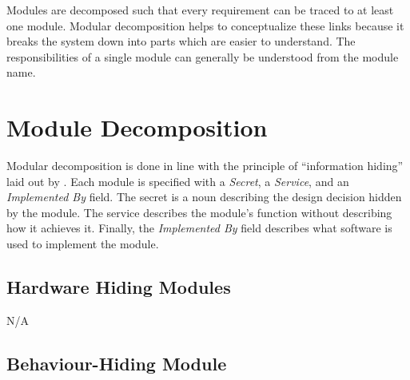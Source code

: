 \documentclass[12pt, titlepage]{article}
\begin{document}
Modules are decomposed such that every requirement can be traced to at least one module. Modular decomposition helps to conceptualize these links because it breaks the system down into parts which are easier to understand. The responsibilities of a single module can generally be understood from the module name.

\section{Module Decomposition} \label{SecMD}

Modular decomposition is done in line with the principle of ``information hiding''
laid out by \citet{ParnasEtAl1984}. Each module is specified with a \emph{Secret}, a \emph{Service}, and an \emph{Implemented By} field. The secret is a noun describing the design decision hidden by the module. The service describes the module's function without describing how it achieves it. Finally, the \emph{Implemented By} field describes what software is used to implement the module.

\subsection{Hardware Hiding Modules}
N/A

\subsection{Behaviour-Hiding Module}

\end{document}
